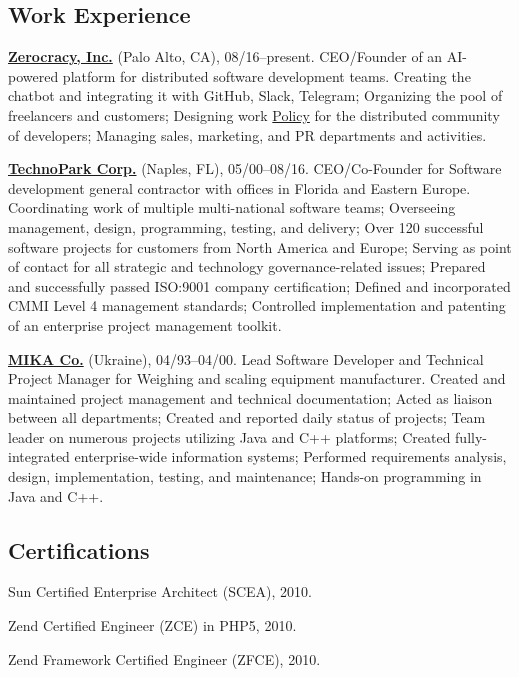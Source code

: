 \documentclass[12pt]{article}
\begin{document}
\subsection*{Work Experience}

\textbf{\href{http://www.zerocracy.com}{Zerocracy, Inc.}} (Palo Alto, CA), 08/16--present.
CEO/Founder of an AI-powered platform for distributed software development teams.
Creating the chatbot and integrating it with GitHub, Slack, Telegram;
Organizing the pool of freelancers and customers;
Designing work \href{https://www.zerocracy.com/policy.html}{Policy} for the distributed community of developers;
Managing sales, marketing, and PR departments and activities.

\textbf{\href{http://www.technoparkcorp.com}{TechnoPark Corp.}} (Naples, FL), 05/00--08/16.
CEO/Co-Founder for Software development general contractor with offices in Florida and Eastern Europe.
Coordinating work of multiple multi-national software teams;
Overseeing management, design, programming, testing, and delivery;
Over 120 successful software projects for customers from North America and Europe;
Serving as point of contact for all strategic and technology governance-related issues;
Prepared and successfully passed ISO:9001 company certification;
Defined and incorporated CMMI Level 4 management standards;
Controlled implementation and patenting of an enterprise project management toolkit.

\textbf{\href{http://www.mika.ua}{MIKA Co.}} (Ukraine), 04/93--04/00.
Lead Software Developer and Technical Project Manager for Weighing and scaling equipment manufacturer.
Created and maintained project management and technical documentation;
Acted as liaison between all departments;
Created and reported daily status of projects;
Team leader on numerous projects utilizing Java and C++ platforms;
Created fully-integrated enterprise-wide information systems;
Performed requirements analysis, design, implementation, testing, and maintenance;
Hands-on programming in Java and C++.

\subsection*{Certifications}

Sun Certified Enterprise Architect (SCEA), 2010.

Zend Certified Engineer (ZCE) in PHP5, 2010.

Zend Framework Certified Engineer (ZFCE), 2010.
\end{document}
